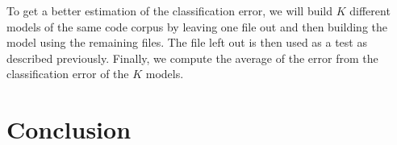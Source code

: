 \documentclass{article} %
\begin{document}
To get a better estimation of the classification error, we will build $K$ different models of the same code corpus by leaving one file out and then building the model using the remaining files. The file left out is then used as a test as described previously. Finally, we compute the average of the error from the classification error of the $K$ models.

\section*{Conclusion}
\end{document}

